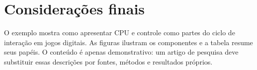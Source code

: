 \section{Considerações finais}
O exemplo mostra como apresentar CPU e controle como partes do ciclo de
interação em jogos digitais. As figuras ilustram os componentes e a tabela
resume seus papéis. O conteúdo é apenas demonstrativo: um artigo de pesquisa
deve substituir essas descrições por fontes, métodos e resultados próprios.

\thispagestyle{fancy}
\clearpage
